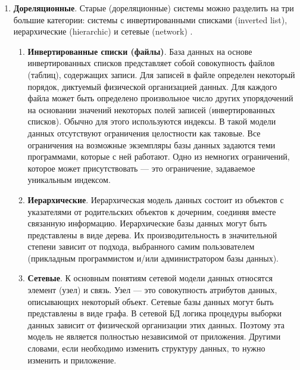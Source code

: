 \begin{enumerate}[label*=\arabic*.]
	\item \textbf{Дореляционные}. \newline
	Старые (дореляционные) системы можно разделить на три большие категории: системы с инвертированными списками (inverted list), иерархические (hierarchic) и сетевые (network) \cite{Date_old}. 
	
		
	\begin{enumerate}[label*=\arabic*.]
		\item \textbf{Инвертированные списки (файлы)}. \newline
		База данных на основе инвертированных списков представляет собой совокупность файлов (таблиц), содержащих записи. Для записей в файле определен некоторый порядок, диктуемый физической организацией данных. Для каждого файла может быть определено произвольное число других упорядочений на основании значений некоторых полей записей (инвертированных списков). Обычно для этого используются индексы. В такой модели данных отсутствуют ограничения целостности как таковые. Все ограничения на возможные экземпляры базы данных задаются теми программами, которые с ней работают. Одно из немногих ограничений, которое может присутствовать --- это ограничение, задаваемое уникальным индексом. 
		
		\item \textbf{Иерархические}. \newline
		Иерархическая модель данных состоит из объектов с указателями от родительских объектов к дочерним, соединяя вместе связанную информацию. Иерархические базы данных могут быть представлены в виде дерева. Их производительность в значительной степени зависит от подхода, выбранного самим пользователем (прикладным программистом и/или администратором базы данных).
		
		\item \textbf{Сетевые}. \newline
		К основным понятиям сетевой модели данных относятся элемент (узел) и связь. Узел --- это совокупность атрибутов данных, описывающих некоторый объект. Сетевые базы данных могут быть представлены в виде графа. В сетевой БД логика процедуры выборки данных зависит от физической организации этих данных. Поэтому эта модель не является полностью независимой от приложения. Другими словами, если необходимо изменить структуру данных, то нужно изменить и приложение.
		

\end{enumerate}
\end{enumerate}
